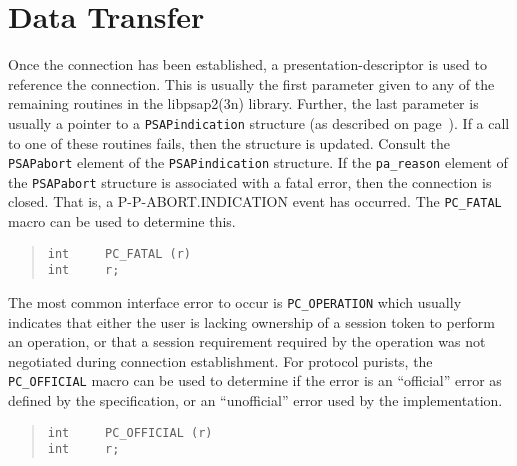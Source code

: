 \section	{Data Transfer}
Once the connection has been established,
a presentation-descriptor is used to reference the connection.
This is usually the first parameter given to any of the remaining routines in
the \man libpsap2(3n) library.
Further,
the last parameter is usually a pointer to a \verb"PSAPindication" structure
(as described on page~\pageref{PSAPindication}).
If a call to one of these routines fails,
then the structure is updated.
Consult the \verb"PSAPabort" element of the \verb"PSAPindication" structure.
If the \verb"pa_reason" element of the \verb"PSAPabort" structure is
associated with a fatal error,
then the connection is closed.
That is, a {\sf P-P-ABORT.INDICATION\/} event has occurred.
The \verb"PC_FATAL" macro can be used to determine this.
\begin{quote}\small\begin{verbatim}
int     PC_FATAL (r)
int     r;
\end{verbatim}\end{quote}
The most common interface error to occur is \verb"PC_OPERATION" which usually
indicates that either the user is lacking ownership of a session token
to perform an operation,
or that a session requirement required by the operation was not negotiated
during connection establishment.
For protocol purists,
the \verb"PC_OFFICIAL" macro can be used to determine if the error is an
``official'' error as defined by the specification,
or an ``unofficial'' error used by the implementation.
\begin{quote}\small\begin{verbatim}
int     PC_OFFICIAL (r)
int     r;
\end{verbatim}\end{quote}

